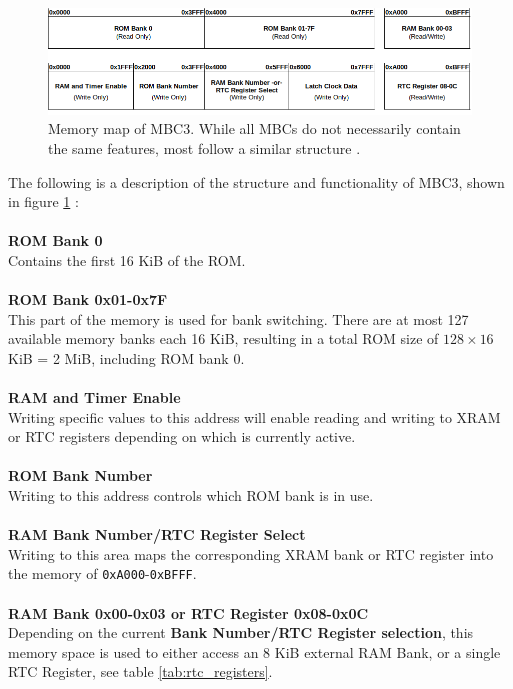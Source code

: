 \begin{figure}[H]
    \centering
    \includegraphics[scale=0.5]{figures/MMU/MBC3_figure_no_padding.png}
    \caption{Memory map of MBC3. While all MBCs do not necessarily contain the same features, most follow a similar structure \cite{GBWikiMBC}.}
    \label{fig:MBC3}
\end{figure}

The following is a description of the structure and functionality of MBC3, shown in figure \ref{fig:MBC3} \cite{GBWikiMBC}:
\\\\
\textbf{ROM Bank 0 }
\\
Contains the first 16 KiB of the ROM.
\\\\
\textbf{ROM Bank 0x01-0x7F}
\\
This part of the memory is used for bank switching. There are at most 127 available memory banks each 16 KiB, resulting in a total ROM size of $128 \times 16$ KiB = 2 MiB, including ROM bank 0.
\\\\
\textbf{RAM and Timer Enable}
\\
Writing specific values to this address will enable reading and writing to XRAM or RTC registers depending on which is currently active.
\\\\
\textbf{ROM Bank Number}
\\
Writing to this address controls which ROM bank is in use.
\\\\
\textbf{RAM Bank Number/RTC Register Select}
\\
Writing to this area maps the corresponding XRAM bank or RTC register into the memory of \texttt{0xA000}-\texttt{0xBFFF}. 
\\\\
\textbf{RAM Bank 0x00-0x03 or RTC Register 0x08-0x0C}
\\
Depending on the current \textbf{Bank Number/RTC Register selection}, this memory space is used to either access an 8 KiB external RAM Bank, or a single RTC Register, see table \ref{tab:rtc_registers}.
